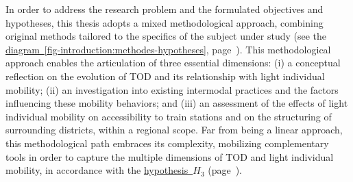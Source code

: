 \begin{refsegment}
In order to address the research problem and the formulated objectives and hypotheses, this thesis adopts a mixed methodological approach, combining original methods tailored to the specifics of the subject under study (see the \hyperref[fig-introduction:methodes-hypotheses]{diagram~\ref{fig-introduction:methodes-hypotheses}}, page~\pageref{fig-introduction:methodes-hypotheses}). This methodological approach enables the articulation of three essential dimensions: (i) a conceptual reflection on the evolution of \acrshort{TOD} and its relationship with light individual mobility; (ii) an investigation into existing intermodal practices and the factors influencing these mobility behaviors; and (iii) an assessment of the effects of light individual mobility on accessibility to train stations and on the structuring of surrounding districts, within a regional scope. Far from being a linear approach, this methodological path embraces its complexity, mobilizing complementary tools in order to capture the multiple dimensions of \acrshort{TOD} and light individual mobility, in accordance with the \hyperref[hypothese-3]{hypothesis~\(H_3\)} (page~\pageref{hypothese-3}).%


\end{refsegment}
